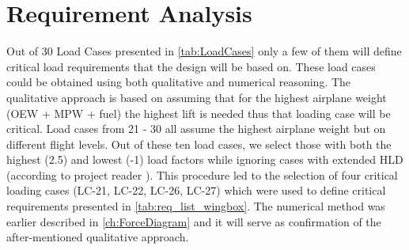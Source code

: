 \section{Requirement Analysis}
\label{sec:Req_Anal_WB}
Out of 30 Load Cases presented in \autoref{tab:LoadCases} only a few of them will define critical load requirements that the design will be based on. These load cases could be obtained using both qualitative and numerical reasoning.
\newline
The qualitative approach is based on assuming that for the highest airplane weight (OEW + MPW + fuel) the highest lift is needed thus that loading case will be critical. Load cases from 21 - 30 all assume the highest airplane weight but on different flight levels. Out of these ten load cases, we select those with both the highest (2.5) and lowest (-1) load factors while ignoring cases with extended HLD (according to project reader \cite{Timmer2024ProjectDesign}). This procedure led to the selection of four critical loading cases (LC-21, LC-22, LC-26, LC-27) which were used to define critical requirements presented in \autoref{tab:req_list_wingbox}.
\newline
The numerical method was earlier described in \autoref{ch:ForceDiagram} and it will serve as confirmation of the after-mentioned qualitative approach.

